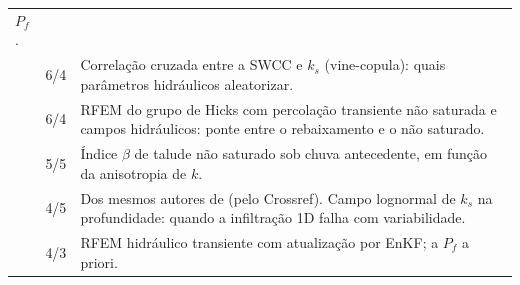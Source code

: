 \documentclass[11pt,a4paper]{article}
\begin{document}
{\begin{longtable}{L{3.3cm}cL{11.6cm}}
  $P_f$. \\
\citet{sharma2020} & 6/4 & Correlação cruzada entre a SWCC e $k_s$ (vine-copula): quais parâmetros hidráulicos
  aleatorizar. \\
\citet{liu2016} & 6/4 & RFEM do grupo de Hicks com percolação transiente não saturada e campos hidráulicos: ponte entre
  o rebaixamento e o não saturado. \\
\citet{mahmood2012} & 5/5 & Índice $\beta$ de talude não saturado sob chuva antecedente, em função da anisotropia de
  $k$. \\
\citet{infiltracao2011} & 4/5 & Dos mesmos autores de \citet{santoso2011} (pelo Crossref). Campo lognormal de $k_s$
  na profundidade: quando a infiltração 1D falha com variabilidade. \\
\citet{liu2017} & 4/3 & RFEM hidráulico transiente com atualização por EnKF; a $P_f$ a priori. \\
\end{longtable}}
\end{document}
